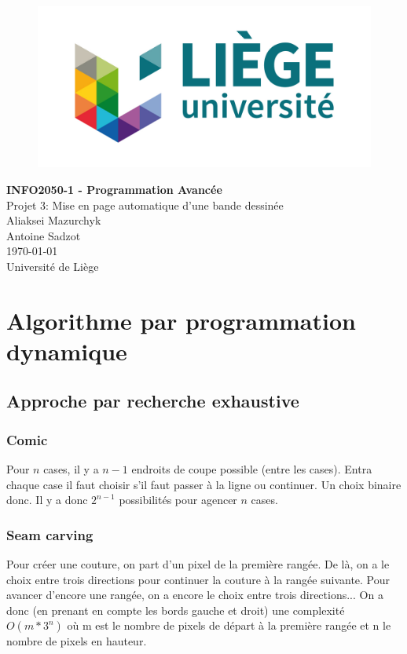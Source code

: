 \documentclass[10pt]{article}
\begin{document}
\begin{titlepage}

   \begin{figure}[htbp]
      \centering
      \includegraphics{uliege-logo-couleurs-300.jpg}
   \end{figure}
  	
  	\hfill

	\begin{center}
		\vfill
		\textbf{
		\Huge{INFO2050-1 - Programmation Avancée}}\\
		\bigskip
		\huge{Projet 3: Mise en page automatique d'une bande dessinée}\\
		\bigskip %
		\smallskip
		\Large{Aliaksei Mazurchyk\\Antoine Sadzot}\\
		\bigskip
		\smallskip
		\large{\today}\\%
		\vfill
		\large{Université de Liège}
	\end{center}
\end{titlepage}
\clearpage
\clearpage

\section{Algorithme par programmation dynamique}
\subsection{Approche par recherche exhaustive}
\subsubsection{Comic}
Pour $n$ cases, il y a $n-1$ endroits de coupe possible (entre les cases). Entra chaque case il faut choisir s'il faut passer à la ligne ou continuer. Un choix binaire donc. Il y a donc $2^{n-1}$ possibilités pour agencer $n$ cases.
\subsubsection{Seam carving}
Pour créer une couture, on part d'un pixel de la première rangée. De là, on a le choix entre trois directions pour continuer la couture à la rangée suivante. Pour avancer d'encore une rangée, on a encore le choix entre trois directions... On a donc (en prenant en compte les bords gauche et droit) une complexité $O(m*3^n)$ où m est le nombre de pixels de départ à la première rangée et n le nombre de pixels en hauteur.
\end{document}
